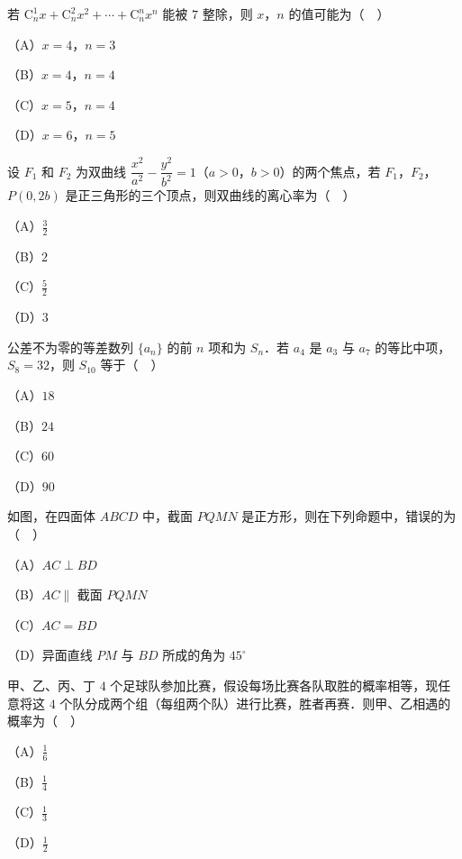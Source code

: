 \begin{question}
若 $\mathrm C_n^1x+\mathrm C_n^2x^2+\cdots+\mathrm C_n^nx^n$ 能被 $7$ 整除，则 $x$，$n$ 的值可能为（　）

（A）$x=4$，$n=3$

（B）$x=4$，$n=4$

（C）$x=5$，$n=4$

（D）$x=6$，$n=5$

\end{question}
\begin{question}
设 $F_1$ 和 $F_2$ 为双曲线 $\dfrac{x^2}{a^2}-\dfrac{y^2}{b^2}=1$（$a>0$，$b>0$）的两个焦点，若 $F_1$，$F_2$，$P(0,2b)$ 是正三角形的三个顶点，则双曲线的离心率为（　）

（A）$\frac32$

（B）$2$

（C）$\frac52$

（D）$3$

\end{question}
\begin{question}
公差不为零的等差数列 $\{a_n\}$ 的前 $n$ 项和为 $S_n$．若 $a_4$ 是 $a_3$ 与 $a_7$ 的等比中项，$S_8=32$，则 $S_{10}$ 等于（　）

（A）$18$

（B）$24$

（C）$60$

（D）$90$

\Needspace{0.4\textheight}
\end{question}
\begingroup
\renewenvironment{question}{\Needspace{0.5\textheight}}{}
\begin{question}
如图，在四面体 $ABCD$ 中，截面 $PQMN$ 是正方形，则在下列命题中，错误的为（　）

（A）$AC\perp BD$

（B）$AC\parallel$ 截面 $PQMN$

（C）$AC=BD$

（D）异面直线 $PM$ 与 $BD$ 所成的角为 $45^\circ$
\nopagebreak[4]
\begin{center}\end{center}
\nopagebreak[4]
\end{question}
\endgroup
\begin{question}
甲、乙、丙、丁 $4$ 个足球队参加比赛，假设每场比赛各队取胜的概率相等，现任意将这 $4$ 个队分成两个组（每组两个队）进行比赛，胜者再赛．则甲、乙相遇的概率为（　）

（A）$\frac16$

（B）$\frac14$

（C）$\frac13$

（D）$\frac12$

\Needspace{0.4\textheight}
\end{question}
